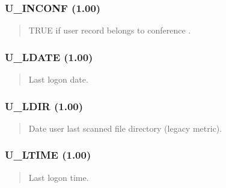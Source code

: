 \documentclass[letterpaper,10pt,english]{sphinxmanual}
\begin{document}
\subsubsection{U\_INCONF (1.00)}
\label{\detokenize{ppl:u-inconf-1-00}}\begin{quote}

\sphinxAtStartPar
{}
\begin{description}
\sphinxAtStartPar
TRUE if user record belongs to conference .

\end{description}
\end{quote}


\subsubsection{U\_LDATE (1.00)}
\label{\detokenize{ppl:u-ldate-1-00}}\begin{quote}

\sphinxAtStartPar
{}
\begin{description}
\sphinxAtStartPar
Last logon date.

\end{description}
\end{quote}


\subsubsection{U\_LDIR (1.00)}
\label{\detokenize{ppl:u-ldir-1-00}}\begin{quote}

\sphinxAtStartPar
{}
\begin{description}
\sphinxAtStartPar
Date user last scanned file directory (legacy metric).

\end{description}
\end{quote}


\subsubsection{U\_LTIME (1.00)}
\label{\detokenize{ppl:u-ltime-1-00}}\begin{quote}

\sphinxAtStartPar
{}
\begin{description}
\sphinxAtStartPar
Last logon time.

\end{description}
\end{quote}
\end{document}
